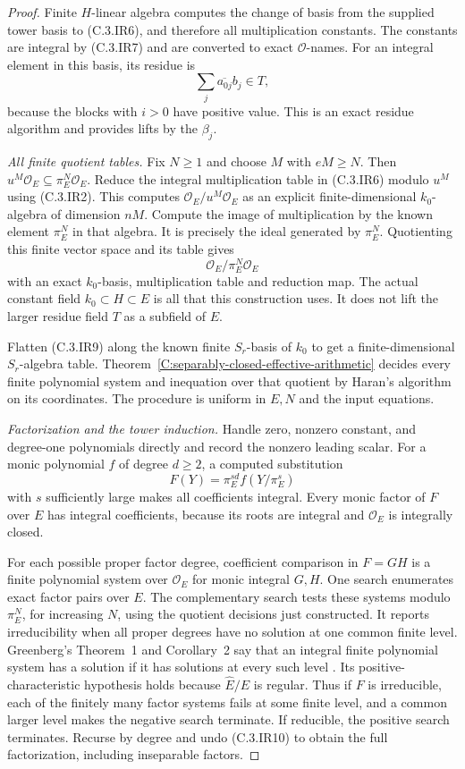 \begin{proof}
Finite $H$-linear algebra
computes the change of basis
from the supplied tower basis
to (C.3.IR6), and therefore
all multiplication constants.
The constants are integral
by (C.3.IR7) and are converted
to exact $\mathcal O$-names.
For an integral element in
this basis, its residue is
\[
           \sum_j\overline{a_{0j}}b_j\in T,            \tag{C.3.IR8}
\]
because the blocks with $i>0$
have positive value.
This is an exact residue
algorithm and provides lifts
by the $\beta_j$.

\emph{All finite quotient tables.}
Fix $N\ge1$ and choose $M$
with $eM\ge N$.
Then $u^M\mathcal O_E\subseteq
\pi_E^N\mathcal O_E$.
Reduce the integral multiplication
table in (C.3.IR6) modulo $u^M$
using (C.3.IR2).
This computes
$\mathcal O_E/u^M\mathcal O_E$
as an explicit finite-dimensional
$k_0$-algebra of dimension $nM$.
Compute the image of multiplication
by the known element $\pi_E^N$
in that algebra.  It is precisely
the ideal generated by $\pi_E^N$.
Quotienting this finite vector
space and its table gives
\[
              \mathcal O_E/\pi_E^N\mathcal O_E         \tag{C.3.IR9}
\]
with an exact $k_0$-basis,
multiplication table and
reduction map.
The actual constant field
$k_0\subset H\subset E$
is all that this construction
uses.  It does not lift the
larger residue field $T$
as a subfield of $E$.

Flatten (C.3.IR9) along the
known finite $S_r$-basis of
$k_0$ to get a finite-dimensional
$S_r$-algebra table.
Theorem~\ref{C:separably-closed-effective-arithmetic}
decides every finite polynomial
system and inequation over
that quotient by Haran's
algorithm on its coordinates.
The procedure is uniform in
$E,N$ and the input equations.

\emph{Factorization and the tower induction.}
Handle zero, nonzero constant,
and degree-one polynomials
directly and record the
nonzero leading scalar.
For a monic polynomial $f$
of degree $d\ge2$, a computed
substitution
\[
             F(Y)=\pi_E^{sd}f(Y/\pi_E^s)              \tag{C.3.IR10}
\]
with $s$ sufficiently large
makes all coefficients integral.
Every monic factor of $F$
over $E$ has integral
coefficients, because its
roots are integral and
$\mathcal O_E$ is integrally
closed.

For each possible proper
factor degree, coefficient
comparison in $F=GH$ is
a finite polynomial system
over $\mathcal O_E$ for
monic integral $G,H$.
One search enumerates exact
factor pairs over $E$.
The complementary search
tests these systems modulo
$\pi_E^N$, for increasing $N$,
using the quotient decisions
just constructed.
It reports irreducibility
when all proper degrees
have no solution at one
common finite level.
Greenberg's Theorem~1 and
Corollary~2 say that an
integral finite polynomial
system has a solution if
it has solutions at every
such level
\cite[pp. 59--62]{C-Greenberg1966}.
Its positive-characteristic
hypothesis holds because
$\widehat E/E$ is regular.
Thus if $F$ is irreducible,
each of the finitely many
factor systems fails at some
finite level, and a common
larger level makes the
negative search terminate.
If reducible, the positive
search terminates.
Recurse by degree and undo
(C.3.IR10) to obtain the
full factorization, including
inseparable factors.


\end{proof}
